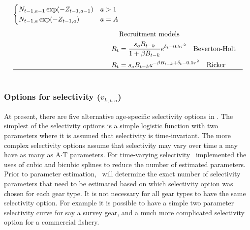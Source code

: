 \begin{multicols}{2}
\begin{tablehere}
\begin{align}
\begin{cases}
            N_{t-1,a-1} \exp(-Z_{t-1,a-1}) &a>1\\
            N_{t-1,a} \exp(-Z_{t-1,a}) & a=A
        \end{cases}\label{T4.11}\\[1ex]
        &\mbox{Recruitment models} \nonumber\\
        R_t &= \frac{s_oB_{t-k}}{1+\beta B_{t-k}}e^{\delta_{t}-0.5\tau^2} \quad \mbox{Beverton-Holt} \label{T4.12}\\
        R_t &= s_oB_{t-k}e^{-\beta B_{t-k}+\delta_t-0.5\tau^2} \quad \mbox{Ricker} \label{T4.13}\\
        \hline \hline \nonumber
    \end{align}

    \normalEq
\end{tablehere}


\subsubsection{Options for selectivity ($v_{k,t,a}$)}

At present, there are five alternative age-specific selectivity options in \iscam.  The simplest of the selectivity options is a simple logistic function with two parameters where it is assumed that selectivity is time-invariant.  The more complex selectivity options assume that selectivity may vary over time a may have as many as A$\cdot$T parameters.  For time-varying selectivity \iscam\ implemented the uses of cubic and bicubic splines to reduce the number of estimated parameters.  Prior to parameter estimation, \iscam\ will determine the exact number of selectivity parameters that need to be estimated based on which selectivity option was chosen for each gear type.  It is not necessary for all gear types to have the same selectivity option.  For example it is possible to have a simple two parameter selectivity curve for say a survey gear, and a much more complicated selectivity option for a commercial fishery.


\end{multicols}
